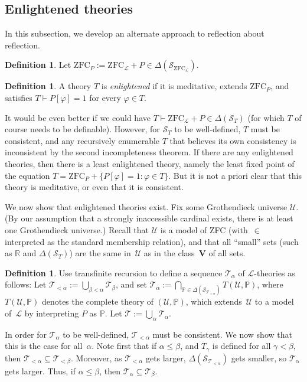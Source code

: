 \documentclass[12pt]{article}
\newcommand{\PP}{\mathbb{P}}
\newcommand{\RR}{\mathbb{R}}
\newcommand{\zfc}{\mathrm{ZFC}}
\newcommand{\zfcl}{{\zfc_\cL}}
\newcommand{\zfcp}{{\zfc_P}}
\newcommand{\cL}{\mathcal{L}}
\newcommand{\cS}{\mathcal{S}}
\newcommand{\cT}{\mathcal{T}}
\newcommand{\cU}{\mathcal{U}}
\theoremstyle{plain}
\theoremstyle{definition}
\newtheorem{definition}[theorem]{Definition}
\theoremstyle{remark}
\begin{document}
\subsection{Enlightened theories}
In this subsection, we develop an alternate approach to reflection about reflection.
\begin{definition}
Let $\zfcp := \zfcl + P\in\Delta(\cS_\zfcl)$.
\end{definition}
\begin{definition}
A theory $T$ is \emph{enlightened} if it is meditative, extends $\zfcp$, and satisfies $T\vdash P[\varphi] = 1$ for every $\varphi\in T$.
\end{definition}
It would be even better if we could have $T\vdash\zfcl + P\in\Delta(\cS_T)$ (for which $T$ of course needs to be definable). However, for $\cS_T$ to be well-defined, $T$ must be consistent, and any recursively enumerable $T$ that believes its own consistency is inconsistent by the second incompleteness theorem.
If there are any enlightened theories, then there is a least enlightened theory, namely the least fixed point of the equation $T = \zfcp + \{P[\varphi] = 1 : \varphi\in T\}$. But it is not a priori clear that this theory is meditative, or even that it is consistent. 

We now show that enlightened theories exist.
Fix some Grothendieck universe $\cU$. (By our assumption that a strongly inaccessible cardinal exists, there is at least one Grothendieck universe.) Recall that $\cU$ is a model of ZFC (with~$\in$ interpreted as the standard membership relation), and that all ``small'' sets (such as $\RR$ and $\Delta(\cS_T)$) are the same in~$\cU$ as in the class~$\mathbf{V}$ of all sets.
\begin{definition}
Use transfinite recursion to define a sequence $\cT_\alpha$ of $\cL$-theories as follows: Let $\cT_{<\alpha} := \bigcup_{\beta<\alpha} \cT_\beta$, and set $\cT_\alpha := \bigcap_{\PP\in\Delta(\cS_{\cT_{<\alpha}})} T(\cU,\PP)$, where $T(\cU,\PP)$ denotes the complete theory of $(\cU,\PP)$, which extends~$\cU$ to a model of~$\cL$ by interpreting $P$ as $\PP$.
Let $\cT := \bigcup_\alpha \cT_\alpha$.
\end{definition}
In order for $\cT_\alpha$ to be well-defined, $\cT_{<\alpha}$ must be consistent. We now show that this is the case for all~$\alpha$.
Note first that if $\alpha\le\beta$, and $T_\gamma$ is defined for all $\gamma<\beta$, then $\cT_{<\alpha}\subseteq\cT_{<\beta}$. Moreover, as $\cT_{<\alpha}$ gets larger, $\Delta(\cS_{\cT_{<\alpha}})$ gets smaller, so $\cT_\alpha$ gets larger. Thus, if $\alpha\le\beta$, then $\cT_\alpha\subseteq\cT_\beta$.
\end{document}
